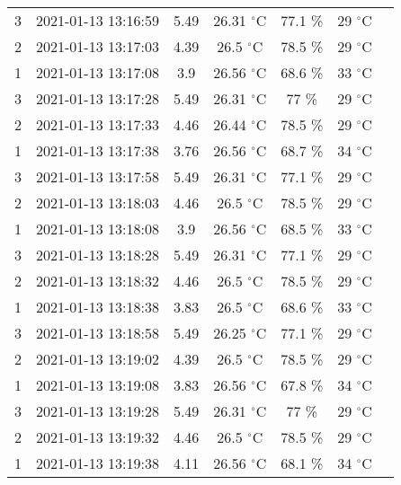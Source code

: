 \begin{itemize}
\begin{table}[H]
\begin{tabular}{ccccccc}
                     3 & 2021-01-13 13:16:59&  5.49 & 26.31 $^{\circ}$C & 77.1 \%& 29 $^{\circ}$C    \\  
                     2 & 2021-01-13 13:17:03 &  4.39 & 26.5 $^{\circ}$C & 78.5 \%& 29 $^{\circ}$C   \\  
                     1 & 2021-01-13 13:17:08 &  3.9 & 26.56 $^{\circ}$C & 68.6 \%& 33 $^{\circ}$C  \\  
                     3 & 2021-01-13 13:17:28 &  5.49 & 26.31 $^{\circ}$C & 77 \%& 29 $^{\circ}$C   \\  
                     2 & 2021-01-13 13:17:33 &  4.46 & 26.44 $^{\circ}$C & 78.5 \%& 29 $^{\circ}$C  \\  
                      1 & 2021-01-13 13:17:38 &  3.76 & 26.56 $^{\circ}$C & 68.7 \%& 34 $^{\circ}$C \\  
                     3 & 2021-01-13 13:17:58 &  5.49 & 26.31 $^{\circ}$C & 77.1 \%& 29 $^{\circ}$C  \\  
                     2 & 2021-01-13 13:18:03 &  4.46 & 26.5 $^{\circ}$C & 78.5 \%& 29 $^{\circ}$C    \\  
                      1 & 2021-01-13 13:18:08 &  3.9 & 26.56 $^{\circ}$C & 68.5 \%& 33 $^{\circ}$C \\  
                     3 & 2021-01-13 13:18:28 &  5.49 & 26.31 $^{\circ}$C & 77.1 \%& 29 $^{\circ}$C  \\  
                    2 & 2021-01-13 13:18:32 &  4.46 & 26.5 $^{\circ}$C & 78.5 \%& 29 $^{\circ}$C   \\  
                    1 & 2021-01-13 13:18:38 &  3.83 & 26.5 $^{\circ}$C & 68.6 \%& 33 $^{\circ}$C    \\  
                    3 & 2021-01-13 13:18:58  &  5.49 & 26.25 $^{\circ}$C & 77.1 \%& 29 $^{\circ}$C   \\  
                    2 & 2021-01-13 13:19:02  &  4.39 & 26.5 $^{\circ}$C & 78.5 \%& 29 $^{\circ}$C   \\  
                   1 & 2021-01-13 13:19:08  &  3.83 & 26.56 $^{\circ}$C & 67.8 \%& 34 $^{\circ}$C  \\  
                   3 & 2021-01-13 13:19:28   &  5.49 & 26.31 $^{\circ}$C & 77 \%& 29 $^{\circ}$C   \\  
                   2 & 2021-01-13 13:19:32  &  4.46 & 26.5 $^{\circ}$C & 78.5 \%& 29 $^{\circ}$C  \\  
                     1 & 2021-01-13 13:19:38 &  4.11 & 26.56 $^{\circ}$C & 68.1 \%& 34 $^{\circ}$C \\  

\end{tabular}
\end{table}
\end{itemize}
